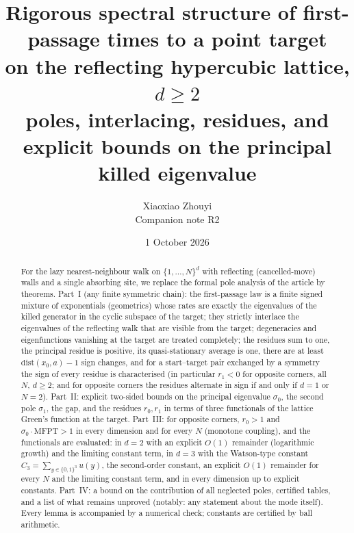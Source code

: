 \documentclass[11pt,a4paper]{article}
\title{Rigorous spectral structure of first-passage times to a point target\\ on the reflecting hypercubic lattice, $d\ge 2$\\[4pt]
\large poles, interlacing, residues, and explicit bounds on the principal killed eigenvalue}
\author{Xiaoxiao Zhouyi\\[2pt]\normalsize Companion note R2}
\date{1 October 2026}
\theoremstyle{plain}
\theoremstyle{definition}
\numberwithin{equation}{section}
\begin{document}
\setlength{\emergencystretch}{3em}
\maketitle
\medskip{}\par\medskip


\begin{abstract}
\noindent For the lazy nearest-neighbour walk on $\{1,\dots,N\}^d$ with reflecting (cancelled-move) walls and a single absorbing site, we replace the formal pole analysis of the article by theorems. Part~I (any finite symmetric chain): the first-passage law is a finite signed mixture of exponentials (geometrics) whose rates are exactly the eigenvalues of the killed generator in the cyclic subspace of the target; they strictly interlace the eigenvalues of the reflecting walk that are visible from the target; degeneracies and eigenfunctions vanishing at the target are treated completely; the residues sum to one, the principal residue is positive, its quasi-stationary average is one, there are at least $\mathrm{dist}(x_0,a)-1$ sign changes, and for a start--target pair exchanged by a symmetry the sign of every residue is characterised (in particular $r_1<0$ for opposite corners, all $N$, $d\ge2$; and for opposite corners the residues alternate in sign if and only if $d=1$ or $N=2$). Part~II: explicit two-sided bounds on the principal eigenvalue $\sigma_0$, the second pole $\sigma_1$, the gap, and the residues $r_0,r_1$ in terms of three functionals of the lattice Green's function at the target. Part~III: for opposite corners, $r_0>1$ and $\sigma_0\cdot\mathrm{MFPT}>1$ in every dimension and for every $N$ (monotone coupling), and the functionals are evaluated: in $d=2$ with an explicit $O(1)$ remainder (logarithmic growth) and the limiting constant term, in $d=3$ with the Watson-type constant $C_3=\sum_{y\in\{0,1\}^3}u(y)$, the second-order constant, an explicit $O(1)$ remainder for every $N$ and the limiting constant term, and in every dimension up to explicit constants. Part~IV: a bound on the contribution of all neglected poles, certified tables, and a list of what remains unproved (notably: any statement about the mode itself). Every lemma is accompanied by a numerical check; constants are certified by ball arithmetic.
\end{abstract}
\end{document}
